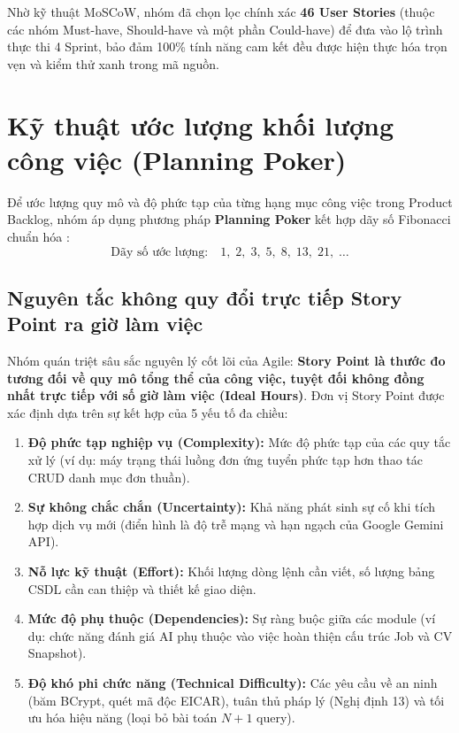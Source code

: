 Nhờ kỹ thuật MoSCoW, nhóm đã chọn lọc chính xác \textbf{46 User Stories} (thuộc các nhóm Must-have, Should-have và một phần Could-have) để đưa vào lộ trình thực thi 4 Sprint, bảo đảm 100\% tính năng cam kết đều được hiện thực hóa trọn vẹn và kiểm thử xanh trong mã nguồn.

\section{Kỹ thuật ước lượng khối lượng công việc (Planning Poker)}
\label{sec:planning-poker}

Để ước lượng quy mô và độ phức tạp của từng hạng mục công việc trong Product Backlog, nhóm áp dụng phương pháp \textbf{Planning Poker} kết hợp dãy số Fibonacci chuẩn hóa \cite{cohn2005}:
\begin{equation}
\text{Dãy số ước lượng:} \quad 1, \; 2, \; 3, \; 5, \; 8, \; 13, \; 21, \; \dots
\end{equation}

\subsection{Nguyên tắc không quy đổi trực tiếp Story Point ra giờ làm việc}
Nhóm quán triệt sâu sắc nguyên lý cốt lõi của Agile: \textbf{Story Point là thước đo tương đối về quy mô tổng thể của công việc, tuyệt đối không đồng nhất trực tiếp với số giờ làm việc (Ideal Hours)}. Đơn vị Story Point được xác định dựa trên sự kết hợp của 5 yếu tố đa chiều:
\begin{enumerate}
    \item \textbf{Độ phức tạp nghiệp vụ (Complexity):} Mức độ phức tạp của các quy tắc xử lý (ví dụ: máy trạng thái luồng đơn ứng tuyển phức tạp hơn thao tác CRUD danh mục đơn thuần).
    \item \textbf{Sự không chắc chắn (Uncertainty):} Khả năng phát sinh sự cố khi tích hợp dịch vụ mới (điển hình là độ trễ mạng và hạn ngạch của Google Gemini API).
    \item \textbf{Nỗ lực kỹ thuật (Effort):} Khối lượng dòng lệnh cần viết, số lượng bảng CSDL cần can thiệp và thiết kế giao diện.
    \item \textbf{Mức độ phụ thuộc (Dependencies):} Sự ràng buộc giữa các module (ví dụ: chức năng đánh giá AI phụ thuộc vào việc hoàn thiện cấu trúc Job và CV Snapshot).
    \item \textbf{Độ khó phi chức năng (Technical Difficulty):} Các yêu cầu về an ninh (băm BCrypt, quét mã độc EICAR), tuân thủ pháp lý (Nghị định 13) và tối ưu hóa hiệu năng (loại bỏ bài toán $N+1$ query).
\end{enumerate}

